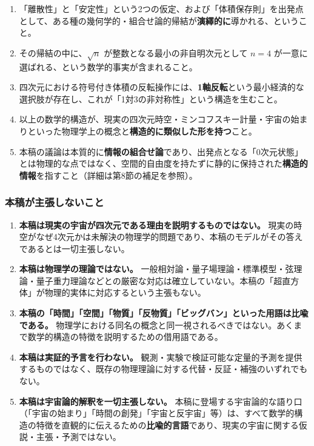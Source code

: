 \documentclass[a4paper,11pt]{ltjsarticle}
\theoremstyle{definition}
\providecommand{\tightlist}{\setlength{\itemsep}{0pt}\setlength{\parskip}{0pt}}
\begin{document}
\begin{enumerate}
\def\labelenumi{\arabic{enumi}.}
\tightlist
\item
  「離散性」と「安定性」という2つの仮定、および「体積保存則」を出発点として、ある種の幾何学的・組合せ論的帰結が\textbf{演繹的に}導かれる、ということ。
\item
  その帰結の中に、\(\sqrt{n}\) が整数となる最小の非自明次元として
  \textbf{\(n = 4\)} が一意に選ばれる、という数学的事実が含まれること。
\item
  四次元における符号付き体積の反転操作には、\textbf{1軸反転}という最小経済的な選択肢が存在し、これが「1対3の非対称性」という構造を生むこと。
\item
  以上の数学的構造が、現実の四次元時空・ミンコフスキー計量・宇宙の始まりといった物理学上の概念と\textbf{構造的に類似した形を持つ}こと。
\item
  本稿の議論は本質的に\textbf{情報の組合せ論}であり、出発点となる「0次元状態」とは物理的な点ではなく、空間的自由度を持たずに静的に保持された\textbf{構造的情報}を指すこと（詳細は第8節の補足を参照）。
\end{enumerate}

\subsubsection{本稿が主張しないこと}\label{ux672cux7a3fux304cux4e3bux5f35ux3057ux306aux3044ux3053ux3068}

\begin{enumerate}
\def\labelenumi{\arabic{enumi}.}
\tightlist
\item
  \textbf{本稿は現実の宇宙が四次元である理由を説明するものではない。}
  現実の時空がなぜ4次元かは未解決の物理学的問題であり、本稿のモデルがその答えであるとは一切主張しない。
\item
  \textbf{本稿は物理学の理論ではない。}
  一般相対論・量子場理論・標準模型・弦理論・量子重力理論などとの厳密な対応は確立していない。本稿の「超直方体」が物理的実体に対応するという主張もない。
\item
  \textbf{本稿の「時間」「空間」「物質」「反物質」「ビッグバン」といった用語は比喩である。}
  物理学における同名の概念と同一視されるべきではない。あくまで数学的構造の特徴を説明するための借用語である。
\item
  \textbf{本稿は実証的予言を行わない。}
  観測・実験で検証可能な定量的予測を提供するものではなく、既存の物理理論に対する代替・反証・補強のいずれでもない。
\item
  \textbf{本稿は宇宙論的解釈を一切主張しない。}
  本稿に登場する宇宙論的な語り口（「宇宙の始まり」「時間の創発」「宇宙と反宇宙」等）は、すべて数学的構造の特徴を直観的に伝えるための\textbf{比喩的言語}であり、現実の宇宙に関する仮説・主張・予測ではない。
\end{enumerate}
\end{document}

